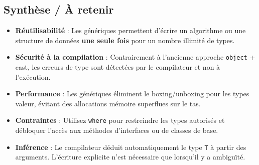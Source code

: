 \subsection{Synthèse / À retenir}

\begin{itemize}
    \item \textbf{Réutilisabilité} : Les génériques permettent d'écrire un algorithme ou une structure de données \textbf{une seule fois} pour un nombre illimité de types.
    \item \textbf{Sécurité à la compilation} : Contrairement à l'ancienne approche \texttt{object} + cast, les erreurs de type sont détectées par le compilateur et non à l'exécution.
    \item \textbf{Performance} : Les génériques éliminent le boxing/unboxing pour les types valeur, évitant des allocations mémoire superflues sur le tas.
    \item \textbf{Contraintes} : Utilisez \texttt{where} pour restreindre les types autorisés et débloquer l'accès aux méthodes d'interfaces ou de classes de base.
    \item \textbf{Inférence} : Le compilateur déduit automatiquement le type \texttt{T} à partir des arguments. L'écriture explicite n'est nécessaire que lorsqu'il y a ambiguïté.
\end{itemize}
